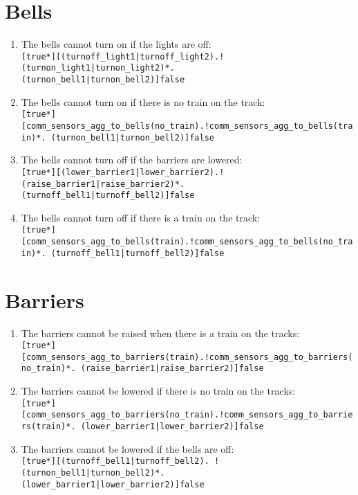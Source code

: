 \documentclass[final]{report}
\begin{document}
\section{Bells}
\label{sec:translated-requirements-bells}

\begin{enumerate}
    \item The bells cannot turn on if the lights are off:\\     
        \texttt{[true*][(turnoff\_light1|turnoff\_light2).!(turnon\_light1|turnon\_light2)*.\\(turnon\_bell1|turnon\_bell2)]false}

    \item The bells cannot turn on if there is no train on the track:\\
        \texttt{[true*][comm\_sensors\_agg\_to\_bells(no\_train).!comm\_sensors\_agg\_to\_bells(train)*. (turnon\_bell1|turnon\_bell2)]false}

    \item The bells cannot turn off if the barriers are lowered:\\
        \texttt{[true*][(lower\_barrier1|lower\_barrier2).!(raise\_barrier1|raise\_barrier2)*.\\(turnoff\_bell1|turnoff\_bell2)]false}

    \item The bells cannot turn off if there is a train on the track:\\
        \texttt{[true*][comm\_sensors\_agg\_to\_bells(train).!comm\_sensors\_agg\_to\_bells(no\_train)*. (turnoff\_bell1|turnoff\_bell2)]false}
\end{enumerate}


\section{Barriers}
\label{sec:translated-requirements-barriers}

\begin{enumerate}
    \item The barriers cannot be raised when there is a train on the tracks:\\
        \texttt{[true*][comm\_sensors\_agg\_to\_barriers(train).!comm\_sensors\_agg\_to\_barriers(no\_train)*. (raise\_barrier1|raise\_barrier2)]false}

    \item The barriers cannot be lowered if there is no train on the tracks:\\   
        \texttt{[true*][comm\_sensors\_agg\_to\_barriers(no\_train).!comm\_sensors\_agg\_to\_barriers(train)*. (lower\_barrier1|lower\_barrier2)]false}

    \item The barriers cannot be lowered if the bells are off:\\    
        \texttt{[true*][(turnoff\_bell1|turnoff\_bell2). !(turnon\_bell1|turnon\_bell2)*.\\(lower\_barrier1|lower\_barrier2)]false}
        
\end{enumerate}
\end{document}
